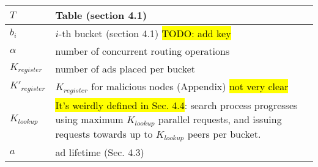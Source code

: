 \begin{table*}
\begin{center}
\begin{tabular}{ | l | p{16cm} |}
        $T$ & Table (section 4.1) \\ \hline
        $b_i$& $i$-th bucket (section 4.1) \hl{TODO: add key} \\ \hline
        $\alpha$ & number of concurrent routing operations \\ \hline
        $K_{\textit{register}}$ & number of ads placed per bucket\\ \hline
        $K'_{\textit{register}}$ & $K_{\textit{register}}$ for malicious nodes (Appendix) \hl {not very clear}\\ \hline
        $K_{\textit{lookup}}$ & \hl{It's weirdly defined in Sec. 4.4}: search process progresses using maximum $K_{\textit{lookup}}$  parallel requests, and issuing requests towards up to $K_{\textit{lookup}}$  peers per bucket.\\ \hline
        $a$ & ad lifetime  (Sec. 4.3)\\ \hline
        

\end{tabular}
\end{center}
\end{table*}
